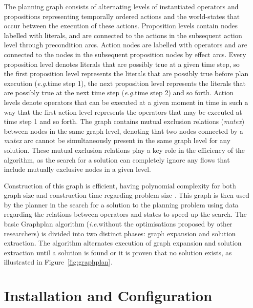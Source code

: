 \documentclass[]{article}
\newcommand\exempli{\emph{e.g.}}
\newcommand\idest{\emph{i.e.}}
\begin{document}
The planning graph consists of alternating levels of instantiated operators and propositions representing temporally ordered actions and the world-states that occur between the execution of these actions. 
Proposition levels contain nodes labelled with literals, and are connected to the actions in the subsequent action level through precondition arcs. 
Action nodes are labelled with operators and are connected to the nodes in the subsequent proposition nodes by effect arcs. 
Every proposition level denotes literals that are possibly true at a given time step, so the first proposition level represents the literals that are possibly true before plan execution (\exempli time step 1), the next proposition level represents the literals that are possibly true at the next time step (\exempli time step 2) and so forth. 
Action levels denote operators that can be executed at a given moment in time in such a way that the first action level represents the operators that may be executed at time step 1 and so forth. 
The graph contains mutual exclusion relations (\emph{mutex}) between nodes in the same graph level, denoting that two nodes connected by a \emph{mutex} arc cannot be simultaneously present in the same graph level for any solution. 
These mutual exclusion relations play a key role in the efficiency of the algorithm, as the search for a solution can completely ignore any flows that include mutually exclusive nodes in a given level.

Construction of this graph is efficient, having polynomial complexity for both graph size and construction time regarding problem size \cite{Blum1997}. This graph is then used by the planner in the search for a solution to the planning problem using data regarding the relations between operators and states to speed up the search. The basic Graphplan algorithm (\idest without the optimisations proposed by other researchers) is divided into two distinct phases: graph expansion and solution extraction. The algorithm alternates execution of graph expansion and solution extraction until a solution is found or it is proven that no solution exists, as illustrated in Figure~\ref{fig:graphplan}.

\section{Installation and Configuration}
\label{sec:installation}
\end{document}
